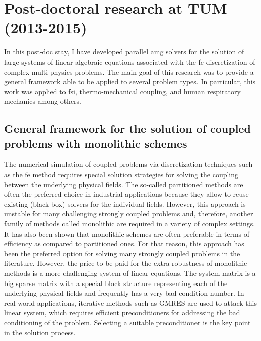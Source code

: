 \documentclass{article}
\newcommand{\bemph}[1]{#1}
\begin{document}
\section{Post-doctoral research at TUM (2013-2015)} \label{sec:tum}

In this post-doc stay, \bemph{I have developed parallel \ac{amg} solvers for the solution of large systems of linear algebraic equations associated with the \ac{fe} discretization of complex multi-physics problems}.  The main goal of this research was to provide a general framework able to be applied to several problem types. In particular, this work was applied to \ac{fsi}, thermo-mechanical coupling, and human respiratory mechanics among others.

\subsection{General framework for the solution of coupled problems with monolithic schemes}

The numerical simulation of coupled problems via discretization techniques such as the \ac{fe} method requires special solution strategies for solving the coupling between
the underlying physical fields. The so-called partitioned methods \cite{felippa_2001} are often the preferred choice in industrial applications because they allow to reuse existing (black-box) solvers for the individual fields. However, this approach is unstable for many challenging strongly coupled problems \cite{forster_2007} and, therefore, another family of methods called monolithic are required in a variety of complex settings. It has also been shown that monolithic schemes are often preferable in terms of efficiency as compared to partitioned ones. For that reason, this approach has been the preferred option for solving many strongly coupled problems in the literature. However, the price to be paid for the extra robustness of monolithic methods is a more challenging system of linear equations. The system matrix is a big sparse matrix with a special block structure representing each of the underlying physical fields and frequently has a very bad condition number. In real-world applications, iterative methods such as GMRES are used to attack this linear system, which requires efficient preconditioners for addressing the bad conditioning of the problem. Selecting a suitable preconditioner is the key point in the solution process.
\end{document}
